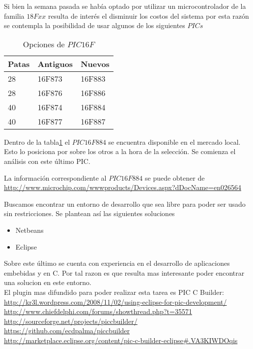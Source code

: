 Si bien la semana pasada se había optado por utilizar un microcontrolador de la familia $18Fxx$ 
resulta de interés el disminuir los costos del sistema por esta razón se contempla la posibilidad
de usar algunos de los siguientes $PICs$

\begin{table}[H]
    \begin{tabular}{l l l}
    \toprule
    \textbf{Patas} & \textbf{Antiguos} & \textbf{Nuevos} \\
    \toprule
    28 & 16F873 & 16F883\\
    28 & 16F876 & 16F886\\
    40 & 16F874 & 16F884\\
    40 & 16F877 & 16F887\\
    \bottomrule
    \end{tabular}
  \caption{Opciones de $PIC 16F$}
  \label{tab:comparacionPIC}
\end{table}

Dentro de la tabla\ref{tab:comparacionPIC} el $PIC16F884$ se encuentra disponible en el mercado local.
Esto lo posiciona por sobre los otros a la hora de la selección. Se comienza el análisis con este 
último PIC.

La información correspondiente al $PIC16F884$ se puede obtener de\\
\url{http://www.microchip.com/wwwproducts/Devices.aspx?dDocName=en026564}

Buscamos encontrar un entorno de desarrollo que sea libre para poder ser usado sin restricciones.
Se plantean así las siguientes soluciones
\begin{itemize}
 \item Netbeans
 \item Eclipse
\end{itemize}
Sobre este último se cuenta con experiencia en el desarrollo de aplicaciones embebidas y en C. Por tal
razon es que resulta mas interesante poder encontrar una solucion en este entorno.\\
El plugin mas difundido para poder realizar esta tarea es PIC C Builder:\\
\url{http://kr3l.wordpress.com/2008/11/02/using-eclipse-for-pic-development/}\\
\url{http://www.chiefdelphi.com/forums/showthread.php?t=35571}\\
\url{http://sourceforge.net/projects/piccbuilder/}\\
\url{https://github.com/ecdpalma/piccbuilder}\\
\url{http://marketplace.eclipse.org/content/pic-c-builder-eclipse#.VA3KIWDOqis}\\

